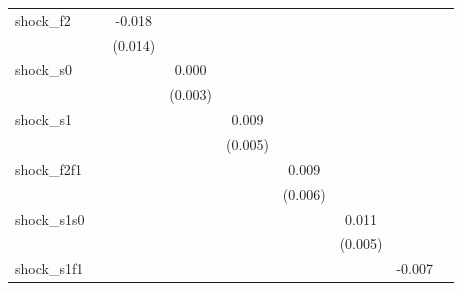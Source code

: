 {\begin{tabular}{l*{8}{c}}
\addlinespace
shock\_f2    &                     &      -0.018         &                     &                     &                     &                     &                     &                     \\
            &                     &     (0.014)         &                     &                     &                     &                     &                     &                     \\
\addlinespace
shock\_s0    &                     &                     &       0.000         &                     &                     &                     &                     &                     \\
            &                     &                     &     (0.003)         &                     &                     &                     &                     &                     \\
\addlinespace
shock\_s1    &                     &                     &                     &       0.009\sym{*}  &                     &                     &                     &                     \\
            &                     &                     &                     &     (0.005)         &                     &                     &                     &                     \\
\addlinespace
shock\_f2f1  &                     &                     &                     &                     &       0.009         &                     &                     &                     \\
            &                     &                     &                     &                     &     (0.006)         &                     &                     &                     \\
\addlinespace
shock\_s1s0  &                     &                     &                     &                     &                     &       0.011\sym{**} &                     &                     \\
            &                     &                     &                     &                     &                     &     (0.005)         &                     &                     \\
\addlinespace
shock\_s1f1  &                     &                     &                     &                     &                     &                     &      -0.007         &                     \\

\end{tabular}}
